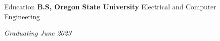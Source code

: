 \begin{rubric}{Education}
\entry*[2018 -- 2023]%
	\textbf{B.S, Oregon State University} Electrical and Computer Engineering
	\par \emph{Graduating June 2023}

\end{rubric}
